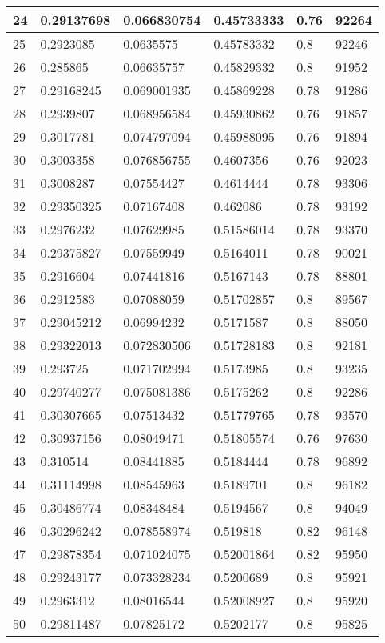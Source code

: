 \begin{longtable}{|l|l|l|l|l|l|}
24 & 0.29137698 & 0.066830754 & 0.45733333 & 0.76 & 92264 \\ \hline 
25 & 0.2923085 & 0.0635575 & 0.45783332 & 0.8 & 92246 \\ \hline 
26 & 0.285865 & 0.06635757 & 0.45829332 & 0.8 & 91952 \\ \hline 
27 & 0.29168245 & 0.069001935 & 0.45869228 & 0.78 & 91286 \\ \hline 
28 & 0.2939807 & 0.068956584 & 0.45930862 & 0.76 & 91857 \\ \hline 
29 & 0.3017781 & 0.074797094 & 0.45988095 & 0.76 & 91894 \\ \hline 
30 & 0.3003358 & 0.076856755 & 0.4607356 & 0.76 & 92023 \\ \hline 
31 & 0.3008287 & 0.07554427 & 0.4614444 & 0.78 & 93306 \\ \hline 
32 & 0.29350325 & 0.07167408 & 0.462086 & 0.78 & 93192 \\ \hline 
33 & 0.2976232 & 0.07629985 & 0.51586014 & 0.78 & 93370 \\ \hline 
34 & 0.29375827 & 0.07559949 & 0.5164011 & 0.78 & 90021 \\ \hline 
35 & 0.2916604 & 0.07441816 & 0.5167143 & 0.78 & 88801 \\ \hline 
36 & 0.2912583 & 0.07088059 & 0.51702857 & 0.8 & 89567 \\ \hline 
37 & 0.29045212 & 0.06994232 & 0.5171587 & 0.8 & 88050 \\ \hline 
38 & 0.29322013 & 0.072830506 & 0.51728183 & 0.8 & 92181 \\ \hline 
39 & 0.293725 & 0.071702994 & 0.5173985 & 0.8 & 93235 \\ \hline 
40 & 0.29740277 & 0.075081386 & 0.5175262 & 0.8 & 92286 \\ \hline 
41 & 0.30307665 & 0.07513432 & 0.51779765 & 0.78 & 93570 \\ \hline 
42 & 0.30937156 & 0.08049471 & 0.51805574 & 0.76 & 97630 \\ \hline 
43 & 0.310514 & 0.08441885 & 0.5184444 & 0.78 & 96892 \\ \hline 
44 & 0.31114998 & 0.08545963 & 0.5189701 & 0.8 & 96182 \\ \hline 
45 & 0.30486774 & 0.08348484 & 0.5194567 & 0.8 & 94049 \\ \hline 
46 & 0.30296242 & 0.078558974 & 0.519818 & 0.82 & 96148 \\ \hline 
47 & 0.29878354 & 0.071024075 & 0.52001864 & 0.82 & 95950 \\ \hline 
48 & 0.29243177 & 0.073328234 & 0.5200689 & 0.8 & 95921 \\ \hline 
49 & 0.2963312 & 0.08016544 & 0.52008927 & 0.8 & 95920 \\ \hline 
50 & 0.29811487 & 0.07825172 & 0.5202177 & 0.8 & 95825 \\ \hline 
\end{longtable}